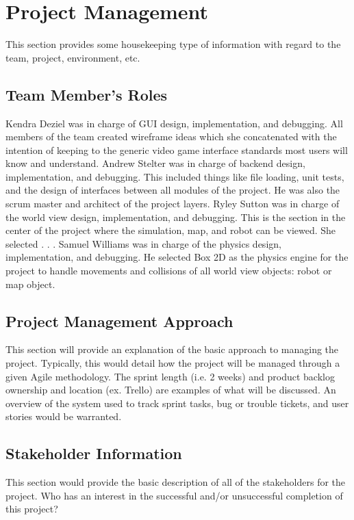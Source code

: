 

\chapter{Project Management}
This section provides some housekeeping type of information with regard to the 
team, project, environment, etc. 



\section{Team Member's Roles}
Kendra Deziel was in charge of GUI design, implementation, and debugging. All members of the team created wireframe ideas which she concatenated with the intention of keeping to the generic video game interface standards most users will know and understand.
Andrew Stelter was in charge of backend design, implementation, and debugging. This included things like file loading, unit tests, and the design of interfaces between all modules of the project. He was also the scrum master and architect of the project layers.
Ryley Sutton was in charge of the world view design, implementation, and debugging. This is the section in the center of the project where the simulation, map, and robot can be viewed. She selected . . . 
Samuel Williams was in charge of the physics design, implementation, and debugging. He selected Box 2D as the physics engine for the project to handle movements and collisions of all world view objects: robot or map object.


\section{Project  Management Approach}
This section will provide an explanation of the basic approach to managing the 
project.  Typically, this would detail how the project will be managed through 
a given Agile methodology.  The sprint length (i.e. 2 weeks) and product backlog 
ownership and location (ex. Trello) are examples of what will be discussed.  An 
overview of the system used to track sprint tasks, bug or trouble tickets, and 
user stories would be warranted. 


\section{ Stakeholder Information}


This section would provide the basic description of all of the stakeholders for 
the project.  Who has an interest in the successful and/or unsuccessful completion 
of this project? 


